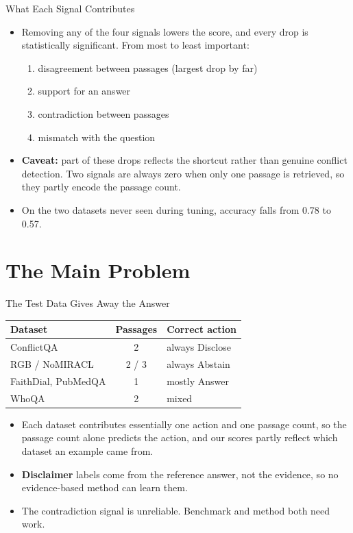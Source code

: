 \documentclass[aspectratio=169]{beamer}
\begin{document}
\begin{frame}{What Each Signal Contributes}
  \begin{itemize}
    \item Removing any of the four signals lowers the score, and every drop is statistically
      significant. From most to least important:
      \begin{enumerate}
        \item disagreement between passages \quad (largest drop by far)
        \item support for an answer
        \item contradiction between passages
        \item mismatch with the question
      \end{enumerate}
    \vspace{0.2cm}
    \item \textbf{Caveat:} part of these drops reflects the shortcut rather than genuine
      conflict detection. Two signals are always zero when only one passage is retrieved, so
      they partly encode the passage count.
    \vspace{0.2cm}
    \item On the two datasets never seen during tuning, accuracy falls from 0.78 to 0.57.
  \end{itemize}
\end{frame}

\section{The Main Problem}

\begin{frame}{The Test Data Gives Away the Answer}
  \small
  \begin{center}
    \begin{tabular}{lcl}
      \toprule
      Dataset & Passages & Correct action \\
      \midrule
      ConflictQA & 2 & always Disclose \\
      RGB / NoMIRACL & 2 / 3 & always Abstain \\
      FaithDial, PubMedQA & 1 & mostly Answer \\
      WhoQA & 2 & mixed \\
      \bottomrule
    \end{tabular}
  \end{center}
  \begin{itemize}
    \item Each dataset contributes essentially one action and one passage count, so the
      passage count alone predicts the action, and our scores partly reflect which dataset an
      example came from.
    \item \textbf{Disclaimer} labels come from the reference answer, not the evidence, so no
      evidence-based method can learn them.
    \item The contradiction signal is unreliable. \alert{Benchmark and method both need work.}
  \end{itemize}
\end{frame}
\end{document}
